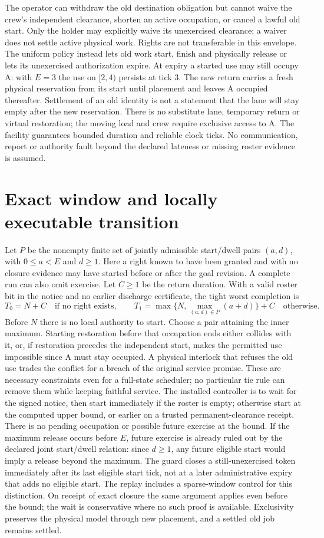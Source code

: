 \documentclass[11pt]{article}
\begin{document}
The operator can withdraw the old destination obligation but cannot waive the crew's independent clearance, shorten an active occupation, or cancel a lawful old start. Only the holder may explicitly waive its unexercised clearance; a waiver does not settle active physical work. Rights are not transferable in this envelope. The uniform policy instead lets old work start, finish and physically release or lets its unexercised authorization expire. At expiry a started use may still occupy A: with $E=3$ the use on $[2,4)$ persists at tick 3. The new return carries a fresh physical reservation from its start until placement and leaves A occupied thereafter. Settlement of an old identity is not a statement that the lane will stay empty after the new reservation. There is no substitute lane, temporary return or virtual restoration; the moving load and crew require exclusive access to A. The facility guarantees bounded duration and reliable clock ticks. No communication, report or authority fault beyond the declared lateness or missing roster evidence is assumed.

\section{Exact window and locally executable transition}
Let $P$ be the nonempty finite set of jointly admissible start/dwell pairs $(a,d)$, with $0\le a<E$ and $d\ge1$. Here a right known to have been granted and with no closure evidence may have started before or after the goal revision. A complete run can also omit exercise. Let $C\ge1$ be the return duration. With a valid roster bit in the notice and no earlier discharge certificate, the tight worst completion is
\[
 T_0=N+C \quad\text{if no right exists},\qquad
 T_1=\max\{N,\max_{(a,d)\in P}(a+d)\}+C \quad\text{otherwise}.
\]
Before $N$ there is no local authority to start. Choose a pair attaining the inner maximum. Starting restoration before that occupation ends either collides with it, or, if restoration precedes the independent start, makes the permitted use impossible since A must stay occupied. A physical interlock that refuses the old use trades the conflict for a breach of the original service promise. These are necessary constraints even for a full-state scheduler; no particular tie rule can remove them while keeping faithful service. The installed controller is to wait for the signed notice, then start immediately if the roster is empty; otherwise start at the computed upper bound, or earlier on a trusted permanent-clearance receipt. There is no pending occupation or possible future exercise at the bound. If the maximum release occurs before $E$, future exercise is already ruled out by the declared joint start/dwell relation: since $d\ge1$, any future eligible start would imply a release beyond the maximum. The guard closes a still-unexercised token immediately after its last eligible start tick, not at a later administrative expiry that adds no eligible start. The replay includes a sparse-window control for this distinction. On receipt of exact closure the same argument applies even before the bound; the wait is conservative where no such proof is available. Exclusivity preserves the physical model through new placement, and a settled old job remains settled.
\end{document}
